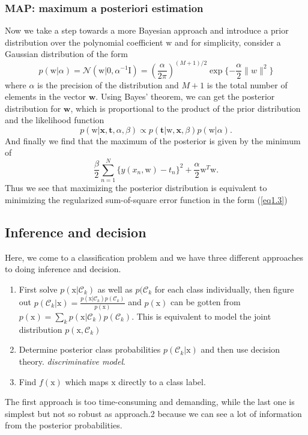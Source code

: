 \documentclass{article}
\newcommand{\norm}{\mathcal N}
\newcommand{\mbf}{\mathbf}
\newcommand{\mrm}{\mathrm}
\begin{document}
\subsubsection*{MAP: maximum a posteriori estimation}
Now we take a step towards a more Bayesian approach and introduce a prior distribution over the polynomial coefficient $\mrm w$ and for simplicity, consider a Gaussian distribution of the form 
\begin{equation}
    p(\mrm w|\alpha) = \norm(\mrm w|0,\alpha^{-1}\mrm I) = (\frac\alpha{2\pi})^{(M+1)/2}\exp\{-\frac\alpha2\|w\|^2\} \tag{1.9}
\end{equation}
where $\alpha$ is the precision of the distribution and $M+1$ is the total number of elements in the vector $\mbf w$. Using Bayes' theorem, we can get the posterior distribution for $\mbf w$, which is proportional to the product of the prior distribution and the likelihood function 
\begin{equation}
    p(\mrm w| \mbf x, \mbf t,\alpha, \beta) \propto p(\mbf t|\mrm w, \mbf x, \beta)p(\mrm w|\alpha).  \tag{1.10}
\end{equation}
And finally we find that the maximum of the posterior is given by the minimum of 
\begin{equation}
    \frac\beta2\sum_{n=1}^N\{y(x_n,\mrm w) -t_n\}^2+\frac\alpha2\mrm w^T\mrm w. \tag{1.11}
\end{equation}
Thus we see that maximizing the posterior distribution is equivalent to minimizing the regularized sum-of-square error function in the form (\ref{eq1.3})

\subsection*{Inference and decision}
Here, we come to a classification problem and we have three different approaches to doing inference and decision.
\begin{enumerate}
    \item First solve $p(\mrm{x}|\mathcal C_k)$ as well as $p(\mathcal C_k$ for each class individually, then figure out $p(\mathcal C_k|\mrm x) = \frac{p(\mathrm x|\mathcal C_k)p(\mathcal C_k)}{p(\mrm x)}$ and $p(\mrm x)$ can be gotten from $p(\mrm x) = \sum_kp(\mrm x|\mathcal C_k)p(\mathcal C_k)$. This is equivalent to model the joint distribution $p(\mrm x, \mathcal C_k)$
  \item Determine posterior class probabilities $p(\mathcal C_k|\mrm x)$  and then use decision theory.  \emph{discriminative model}.
  \item Find $f(\mathrm x)$ which maps $\mrm{x}$ directly to a class label.
\end{enumerate}
The first approach is too time-consuming and demanding, while the last one is simplest but not so robust as approach.2 because we can see a lot of information from the posterior probabilities.
\end{document}
